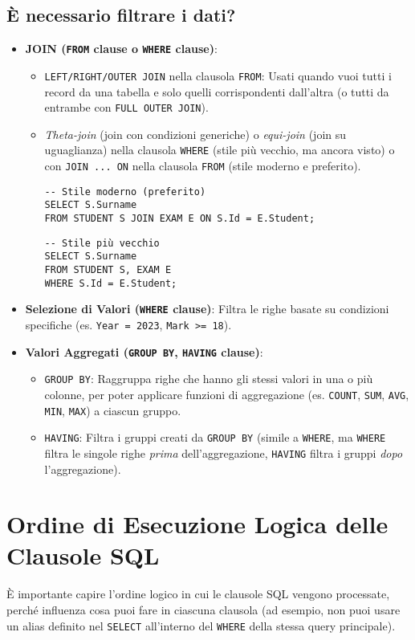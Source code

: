 \subsection{È necessario filtrare i dati?}
\begin{itemize}
    \item \textbf{JOIN (\texttt{FROM} clause o \texttt{WHERE} clause)}:
    \begin{itemize}
        \item \texttt{LEFT/RIGHT/OUTER JOIN} nella clausola \texttt{FROM}: Usati quando vuoi tutti i record da una tabella e solo quelli corrispondenti dall'altra (o tutti da entrambe con \texttt{FULL OUTER JOIN}).
        \item \textit{Theta-join} (join con condizioni generiche) o \textit{equi-join} (join su uguaglianza) nella clausola \texttt{WHERE} (stile più vecchio, ma ancora visto) o con \texttt{JOIN ... ON} nella clausola \texttt{FROM} (stile moderno e preferito).
        \begin{verbatim}
-- Stile moderno (preferito)
SELECT S.Surname
FROM STUDENT S JOIN EXAM E ON S.Id = E.Student;
        \end{verbatim}
        \begin{verbatim}
-- Stile più vecchio
SELECT S.Surname
FROM STUDENT S, EXAM E
WHERE S.Id = E.Student;
        \end{verbatim}
    \end{itemize}
    \item \textbf{Selezione di Valori (\texttt{WHERE} clause)}: Filtra le righe basate su condizioni specifiche (es. \texttt{Year = 2023}, \texttt{Mark >= 18}).
    \item \textbf{Valori Aggregati (\texttt{GROUP BY}, \texttt{HAVING} clause)}:
    \begin{itemize}
        \item \texttt{GROUP BY}: Raggruppa righe che hanno gli stessi valori in una o più colonne, per poter applicare funzioni di aggregazione (es. \texttt{COUNT}, \texttt{SUM}, \texttt{AVG}, \texttt{MIN}, \texttt{MAX}) a ciascun gruppo.
        \item \texttt{HAVING}: Filtra i gruppi creati da \texttt{GROUP BY} (simile a \texttt{WHERE}, ma \texttt{WHERE} filtra le singole righe \textit{prima} dell'aggregazione, \texttt{HAVING} filtra i gruppi \textit{dopo} l'aggregazione).
    \end{itemize}
\end{itemize}

\section{Ordine di Esecuzione Logica delle Clausole SQL}
È importante capire l'ordine logico in cui le clausole SQL vengono processate, perché influenza cosa puoi fare in ciascuna clausola (ad esempio, non puoi usare un alias definito nel \texttt{SELECT} all'interno del \texttt{WHERE} della stessa query principale).

